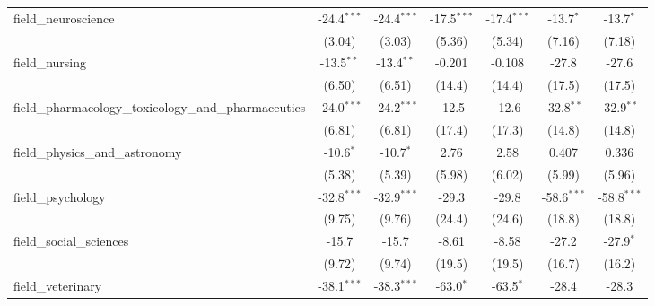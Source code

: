 \begin{tabular}{lcccccc}
   field\_neuroscience                                         & -24.4$^{***}$  & -24.4$^{***}$  & -17.5$^{***}$ & -17.4$^{***}$ & -13.7$^{*}$   & -13.7$^{*}$\\   
                                                               & (3.04)         & (3.03)         & (5.36)        & (5.34)        & (7.16)        & (7.18)\\   
   field\_nursing                                              & -13.5$^{**}$   & -13.4$^{**}$   & -0.201        & -0.108        & -27.8         & -27.6\\   
                                                               & (6.50)         & (6.51)         & (14.4)        & (14.4)        & (17.5)        & (17.5)\\   
   field\_pharmacology\_toxicology\_and\_pharmaceutics         & -24.0$^{***}$  & -24.2$^{***}$  & -12.5         & -12.6         & -32.8$^{**}$  & -32.9$^{**}$\\   
                                                               & (6.81)         & (6.81)         & (17.4)        & (17.3)        & (14.8)        & (14.8)\\   
   field\_physics\_and\_astronomy                              & -10.6$^{*}$    & -10.7$^{*}$    & 2.76          & 2.58          & 0.407         & 0.336\\   
                                                               & (5.38)         & (5.39)         & (5.98)        & (6.02)        & (5.99)        & (5.96)\\   
   field\_psychology                                           & -32.8$^{***}$  & -32.9$^{***}$  & -29.3         & -29.8         & -58.6$^{***}$ & -58.8$^{***}$\\   
                                                               & (9.75)         & (9.76)         & (24.4)        & (24.6)        & (18.8)        & (18.8)\\   
   field\_social\_sciences                                     & -15.7          & -15.7          & -8.61         & -8.58         & -27.2         & -27.9$^{*}$\\   
                                                               & (9.72)         & (9.74)         & (19.5)        & (19.5)        & (16.7)        & (16.2)\\   
   field\_veterinary                                           & -38.1$^{***}$  & -38.3$^{***}$  & -63.0$^{*}$   & -63.5$^{*}$   & -28.4         & -28.3\\   

\end{tabular}
